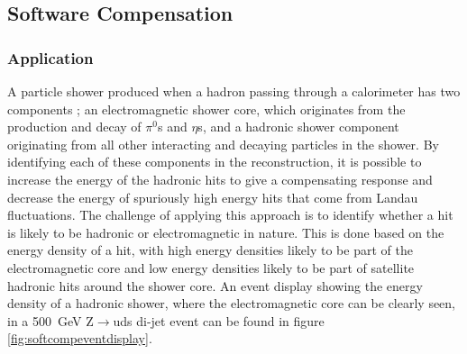 
\subsection{Software Compensation}
\label{sec:softcomp}
\subsubsection{Application}
A particle shower produced when a hadron passing through a calorimeter has two components \cite{Wigmans:2000vf}; an electromagnetic shower core, which originates from the production and decay of $\pi^{0}$s and $\eta$s, and a hadronic shower component originating from all other interacting and decaying particles in the shower.  By identifying each of these components in the reconstruction, it is possible to increase the energy of the hadronic hits to give a compensating response and decrease the energy of spuriously high energy hits that come from Landau fluctuations.  The challenge of applying this approach is to identify whether a hit is likely to be hadronic or electromagnetic in nature.  This is done based on the energy density of a hit, with high energy densities likely to be part of the electromagnetic core and low energy densities likely to be part of satellite hadronic hits around the shower core.  An event display showing the energy density of a hadronic shower, where the electromagnetic core can be clearly seen, in a 500~GeV Z$\rightarrow$uds di-jet event can be found in figure \ref{fig:softcompeventdisplay}.  

